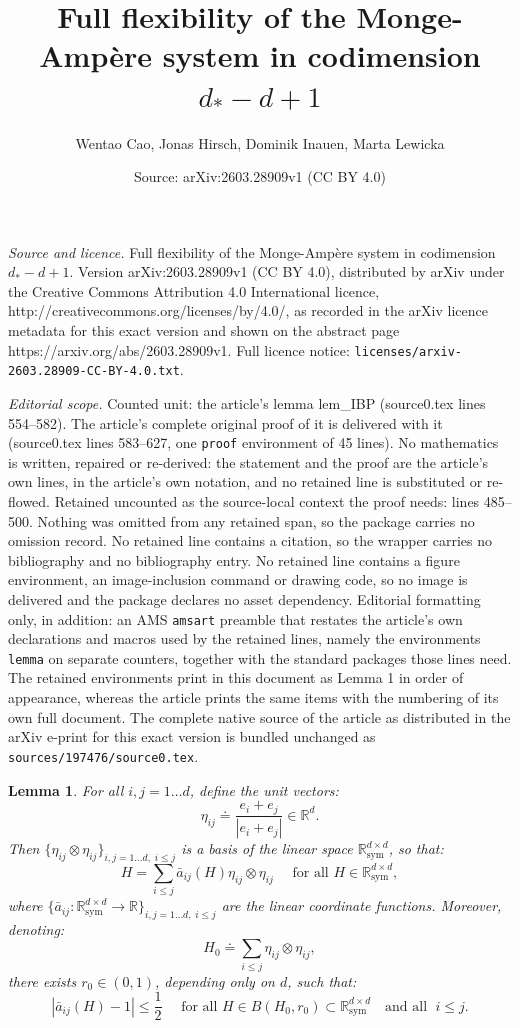 \documentclass[10pt,a4paper]{amsart}
\title{Full flexibility of the Monge-Amp\`ere system in codimension $d_*-d+1$}
\author{Wentao Cao, Jonas Hirsch, Dominik Inauen, Marta Lewicka}
\date{Source: arXiv:2603.28909v1 (CC BY 4.0)}
\newtheorem{lemma}{Lemma}
\newcommand{\R}{\mathbb{R}}
\newcommand{\sym}{\mathrm{sym}}
\begin{document}
\maketitle

\noindent\emph{Source and licence.} Full flexibility of the Monge-Amp\`ere system in codimension $d_*-d+1$. Version arXiv:2603.28909v1 (CC BY 4.0), distributed by arXiv under the Creative Commons Attribution 4.0 International licence, http://creativecommons.org/licenses/by/4.0/, as recorded in the arXiv licence metadata for this exact version and shown on the abstract page https://arxiv.org/abs/2603.28909v1. Full licence notice: \texttt{licenses/arxiv-2603.28909-CC-BY-4.0.txt}.\par\smallskip

\noindent\textit{Editorial scope.} Counted unit: the article's lemma lem\_IBP (source0.tex lines 554--582). The article's complete original proof of it is delivered with it (source0.tex lines 583--627, one \texttt{proof} environment of 45 lines). No mathematics is written, repaired or re-derived: the statement and the proof are the article's own lines, in the article's own notation, and no retained line is substituted or re-flowed.  Retained uncounted as the source-local context the proof needs: lines 485--500.  Nothing was omitted from any retained span, so the package carries no omission record.  No retained line contains a citation, so the wrapper carries no bibliography and no bibliography entry.  No retained line contains a figure environment, an image-inclusion command or drawing code, so no image is delivered and the package declares no asset dependency.  Editorial formatting only, in addition: an AMS \texttt{amsart} preamble that restates the article's own declarations and macros used by the retained lines, namely the environments \texttt{lemma} on separate counters, together with the standard packages those lines need.  The retained environments print in this document as Lemma 1 in order of appearance, whereas the article prints the same items with the numbering of its own full document.  The complete native source of the article as distributed in the arXiv e-print for this exact version is bundled unchanged as \texttt{sources/197476/source0.tex}.
\begin{lemma}\label{lem_dec_def}
For all $i,j=1\ldots d$, define the unit vectors:
$$\eta_{ij}\doteq\frac{e_i+e_j}{|e_i+e_j|} \in\R^d.$$
Then $\{\eta_{ij}\otimes \eta_{ij}\}_{i,j=1\ldots d,\;i\leq j}$ is a basis of the
linear space $\R^{d\times d}_\sym$, so that:
$$H=\sum_{i\leq j}\bar a_{ij}(H) \eta_{ij}\otimes \eta_{ij}
\quad\mbox{ for all } H\in \R^{d\times d}_\sym,$$
where $\big\{\bar a_{ij}:\R^{d\times d}_\sym\to \R\big\}_{i,j=1\ldots d,\;i\leq j}$
are the linear coordinate functions. Moreover, denoting:
\begin{equation}\label{H_0}
H_0 \doteq \sum_{i\leq j}\eta_{ij}\otimes \eta_{ij},
\end{equation}
there exists $r_0\in (0, 1)$, depending only on $d$, such that:
$$|\bar a_{ij} (H)-1|\leq\frac{1}{2} \quad \mbox{ for all } H\in
B(H_0,r_0)\subset \R^{d\times d}_{\sym} \quad \mbox{and all }\; i \leq j.$$
\end{lemma}
\end{document}
